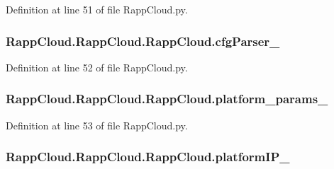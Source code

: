 Definition at line 51 of file Rapp\-Cloud.\-py.

\hypertarget{classRappCloud_1_1RappCloud_1_1RappCloud_a2f9a4dc57603f431e1253e3b3e875b2e}{
\subsubsection[{cfg\-Parser\-\_\-}]{\setlength{\rightskip}{0pt plus 5cm}Rapp\-Cloud.\-Rapp\-Cloud.\-Rapp\-Cloud.\-cfg\-Parser\-\_\-}}\label{classRappCloud_1_1RappCloud_1_1RappCloud_a2f9a4dc57603f431e1253e3b3e875b2e}


Definition at line 52 of file Rapp\-Cloud.\-py.

\hypertarget{classRappCloud_1_1RappCloud_1_1RappCloud_a2b520886fb7ab3eebfab76aeb34cef97}{
\subsubsection[{platform\-\_\-params\-\_\-}]{\setlength{\rightskip}{0pt plus 5cm}Rapp\-Cloud.\-Rapp\-Cloud.\-Rapp\-Cloud.\-platform\-\_\-params\-\_\-}}\label{classRappCloud_1_1RappCloud_1_1RappCloud_a2b520886fb7ab3eebfab76aeb34cef97}


Definition at line 53 of file Rapp\-Cloud.\-py.

\hypertarget{classRappCloud_1_1RappCloud_1_1RappCloud_ae942be1659a3c338b5488fbc55c79ad0}{
\subsubsection[{platform\-I\-P\-\_\-}]{\setlength{\rightskip}{0pt plus 5cm}Rapp\-Cloud.\-Rapp\-Cloud.\-Rapp\-Cloud.\-platform\-I\-P\-\_\-}}\label{classRappCloud_1_1RappCloud_1_1RappCloud_ae942be1659a3c338b5488fbc55c79ad0}


